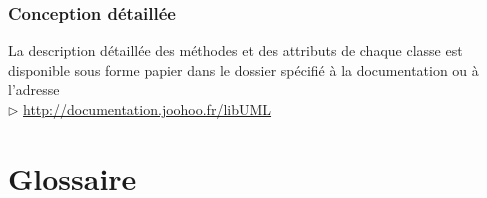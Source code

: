 \documentclass[12pt,a4paper,openany]{report}
\begin{document}
	\subsection{Conception détaillée}
	La description détaillée des méthodes et des attributs de chaque classe est disponible sous forme papier dans le dossier spécifié à la
	documentation ou à l'adresse \\
	$\rhd$ \url{http://documentation.joohoo.fr/libUML}
	
	\chapter{Glossaire}
	\begin{sortedlist}
		
	\end{sortedlist}
\end{document}
